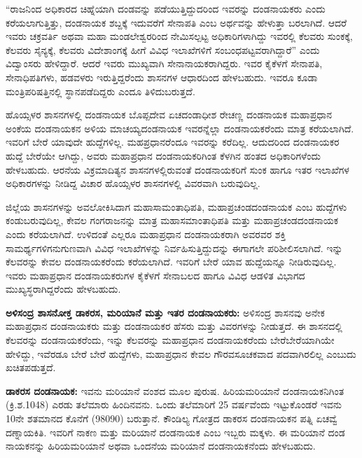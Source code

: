 “ರಾಜನಿಂದ ಅಧಿಕಾರದ ಚಿಹ್ನೆಯಾಗಿ ದಂಡವನ್ನು ಪಡೆಯುತ್ತಿದ್ದುದರಿಂದ ಇವರನ್ನು ದಂಡನಾಯಕರು ಎಂದು ಕರೆಯಲಾಗು\-ತ್ತಿತ್ತು, ದಂಡನಾಯಕ ಶಬ್ದಕ್ಕೆ ಇದುವರೆಗೆ ಸೇನಾಪತಿ ಎಂಬ ಅರ್ಥವನ್ನು ಹೇಳುತ್ತಾ ಬರಲಾಗಿದೆ. ಆದರೆ ಇವರು ಚಕ್ರವರ್ತಿ ಅಥವಾ ಮಹಾ ಮಂಡಲೇಶ್ವರರಿಂದ ನೇಮಿಸಲ್ಪಟ್ಟ ಅಧಿಕಾರಿಗಳಾಗಿದ್ದು ಇವರಲ್ಲಿ ಕೆಲವರು ಸುಂಕಕ್ಕೆ, ಕೆಲವರು ಸೈನ್ಯಕ್ಕೆ, ಕೆಲವರು ವಿದೇಶಾಂಗಕ್ಕೆ ಹೀಗೆ ವಿವಿಧ ಇಲಾಖೆಗಳಿಗೆ ಸಂಬಂಧಪಟ್ಟವರಾಗಿದ್ದಾರೆ” ಎಂದು ವಿದ್ವಾಂಸರು ಹೇಳಿದ್ದಾರೆ. ಆದರೆ ಇವರು ಮುಖ್ಯವಾಗಿ ಸೇನಾನಾಯಕರಾಗಿದ್ದರು. ಇವರ ಕೈಕೆಳಗೆ ಸೇನಾಪತಿ, ಸೇನಾಧಿಪತಿಗಳು, ಹಡವಳರು ಇರುತ್ತಿದ್ದರೆಂದು ಶಾಸನಗಳ ಆಧಾರದಿಂದ ಹೇಳಬಹುದು. ಇವರೂ ಕೂಡಾ ಮಂತ್ರಿಪರಿಷತ್ತಿನಲ್ಲಿ ಸ್ಥಾನಪಡೆದಿದ್ದರು ಎಂದೂ ತಿಳಿದುಬರುತ್ತದೆ.

ಹೊಯ್ಸಳರ ಶಾಸನಗಳಲ್ಲಿ ದಂಡನಾಯಕ ಬೊಪ್ಪದೇವ ಏಚದಂಡಾಧೀಶ ರೇಚಣ್ಣ ದಂಡನಾಯಕ ಮಹಾಪ್ರಧಾನ ಅಂಕೆಯ ದಂಡನಾಯಕನ ಅಳಿಯ ಮಾಚಯ್ಯದಂಡನಾಯಕ ಇವರನ್ನೆಲ್ಲಾ ದಂಡನಾಯಕರೆಂದು ಮಾತ್ರ ಕರೆಯಲಾಗಿದೆ. ಇವರಿಗೆ ಬೇರೆ ಯಾವುದೇ ಹುದ್ದೆಗಳಿಲ್ಲ. ಮಹಪ್ರಧಾನರೆಂದೂ ಇವರನ್ನು ಕರೆದಿಲ್ಲ. ಆದುದರಿಂದ ದಂಡನಾಯಕರ ಹುದ್ದೆ ಬೇರೆಯೇ ಆಗಿದ್ದು, ಅವರು ಮಹಾಪ್ರಧಾನ ದಂಡನಾಯಕರಿಗಿಂತ ಕೆಳಗಿನ ಹಂತದ ಅಧಿಕಾರಿಗಳೆಂದು ಹೇಳಬಹುದು. ಆರನೆಯ ವಿಕ್ರಮಾದಿತ್ಯನ ಶಾಸನಗಳಲ್ಲಿರುವಂತೆ ದಂಡನಾಯಕರಿಗೆ ಸುಂಕ ಹಾಗೂ ಇತರ ಇಲಾಖೆಗಳ ಅಧಿಕಾರಗಳನ್ನು ನೀಡಿದ್ದ ವಿಚಾರ ಹೊಯ್ಸಳರ ಶಾಸನಗಳಲ್ಲಿ ವಿವರವಾಗಿ ಬರುವುದಿಲ್ಲ.

ಜಿಲ್ಲೆಯ ಶಾಸನಗಳನ್ನು ಅವಲೋಕಿಸಿದಾಗ ಮಹಾಸಾಮಂತಾಧಿಪತಿ, ಮಹಾಪ್ರಚಂಡದಂಡನಾಯಕ ಎಂಬ ಹುದ್ದೆ\-ಗಳು ಕಂಡುಬರುವುದಿಲ್ಲ, ಕೇವಲ ಗಂಗರಾಜನನ್ನು ಮಾತ್ರ ಮಹಾಸಮಾಂತಾಧಿಪತಿ ಮತ್ತು ಮಹಾಪ್ರಚಂಡದಂಡನಾಯಕ ಎಂದು ಕರೆಯಲಾಗಿದೆ. ಉಳಿದಂತೆ ಎಲ್ಲರೂ ಮಹಾಪ್ರಧಾನ ದಂಡನಾಯಕರಾಗಿ ಅವರವರ ಶಕ್ತಿ ಸಾಮರ್ಥ್ಯಗಳಿಗನುಗುಣವಾಗಿ ವಿವಿಧ ಇಲಾಖೆಗಳನ್ನು ನಿರ್ವಹಿಸುತ್ತಿದ್ದುದನ್ನು ಈಗಾಗಲೇ ಪರಿಶೀಲಿಸಲಾಗಿದೆ. ಇನ್ನು ಕೆಲವರನ್ನು ಕೇವಲ ದಂಡನಾಯಕರೆಂದು ಕರೆಯಲಾಗಿದೆ. ಇವರಿಗೆ ಬೇರೆ ಯಾವ ಹುದ್ದೆಯನ್ನೂ ನೀಡಿರುವುದಿಲ್ಲ. ಇವರು ಮಹಾಪ್ರಧಾನ ದಂಡನಾಯಕರುಗಳ ಕೈಕೆಳಗೆ ಸೇನಾಬಲದ ಹಾಗೂ ವಿವಿಧ ಆಡಳಿತ ವಿಭಾಗದ ಮುಖ್ಯಸ್ಥರಾಗಿದ್ದರೆಂದು ಹೇಳಬಹುದು.

\textbf{ಅಳಿಸಂದ್ರ ಶಾಸನೋಕ್ತ ಡಾಕರಸ, ಮರಿಯಾನೆ ಮತ್ತು ಇತರ ದಂಡನಾಯಕರು:} ಅಳಿಸಂದ್ರ ಶಾಸನವು ಅನೇಕ ಮಹಾಪ್ರಧಾನ ದಂಡನಾಯಕರು ಮತ್ತು ದಂಡನಾಯಕರ ಹೆಸರು ಮತ್ತು ವಿವರಗಳನ್ನು ನೀಡುತ್ತದೆ. ಈ ಶಾಸನದಲ್ಲಿ ಕೆಲವರನ್ನು ದಂಡನಾಯಕರೆಂದು, ಇನ್ನು ಕೆಲವರನ್ನು ಮಹಾಪ್ರಧಾನ ದಂಡನಾಯಕರೆಂದು ಬೇರೆಬೇರೆಯಾಗಿಯೇ ಹೇಳಿದ್ದು, ಇವೆರಡೂ ಬೇರೆ ಬೇರೆ ಹುದ್ದೆಗಳು, ಮಹಾಪ್ರಧಾನ ಕೇವಲ ಗೌರವಸೂಚಕವಾದ ಪದವಾಗಿರಲಿಲ್ಲ ಎಂಬುದು ಖಚಿತಪಡುತ್ತದೆ.

\textbf{ಡಾಕರಸ ದಂಡನಾಯಕ:} ಇವನು ಮರಿಯಾನೆ ವಂಶದ ಮೂಲ ಪುರುಷ. ಹಿರಿಯಮರಿಯಾನೆ ದಂಡನಾಯಕನಿಗಿಂತ (ಕ್ರಿ.ಶ.1048) ಎರಡು ತಲೆಮಾರು ಹಿಂದಿನವನು. ಒಂದು ತಲೆಮಾರಿಗೆ 25 ವರ್ಷವೆಂದು ಇಟ್ಟುಕೊಂಡರೆ ಇವನು 10ನೇ ಶತಮಾನದ ಕೊನೆಗೆ (980\enginline{-}90) ಬರುತ್ತಾನೆ. ಕೌಂಡಿಲ್ಯ ಗೋತ್ರದ ಡಾಕರಸ ದಂಡನಾಯಕನ ಪತ್ನಿ ಏಚವ್ವೆ ದಣ್ನಾಯಕಿತಿ. ಇವರಿಗೆ ನಾಕಣ ಮತ್ತು ಮರಿಯಾನೆ ದಂಡನಾಯಕ ಎಂಬ ಇಬ್ಬರು ಮಕ್ಕಳು. ಈ ಮರಿಯಾನೆ ದಂಡ ನಾಯಕನನ್ನು ಹಿರಿಯಮರಿಯಾನೆ ಅಥವಾ ಒಂದನೆಯ ಮರಿಯಾನೆ ದಂಡನಾಯಕನೆಂದು ಹೇಳಬಹುದು.

